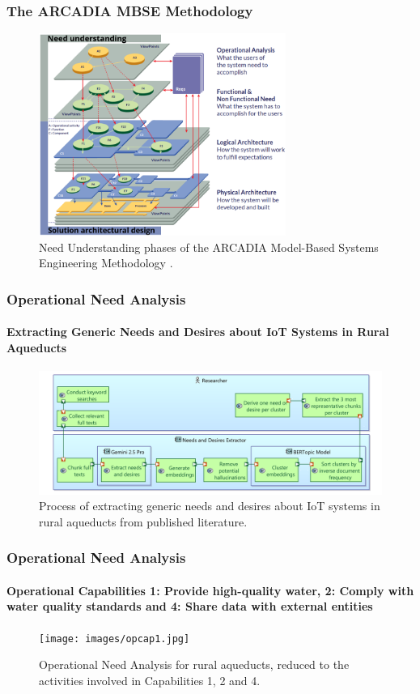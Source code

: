 \documentclass{beamer}
\begin{document}
\begin{frame}
    \frametitle{\small The ARCADIA MBSE Methodology}

    \begin{figure}
        \centering
        \includegraphics[width=0.72\textwidth]{images/phases_arcadia.png}
        \caption{Need Understanding phases of the ARCADIA Model-Based Systems Engineering Methodology \cite{Arcadia_phases}.}
    \end{figure}
\end{frame}


\begin{frame}
    \frametitle{\small Operational Need Analysis}
    \framesubtitle{Extracting Generic Needs and Desires about IoT Systems in Rural Aqueducts}

    \begin{figure}
        \centering
        \includegraphics[width=\textwidth]{images/bertopic.png}
        \caption{Process of extracting generic needs and desires about IoT systems in rural aqueducts from published literature.}
    \end{figure}
\end{frame}

\begin{frame}
    \frametitle{\small Operational Need Analysis}
    \framesubtitle{Operational Capabilities 1: Provide high-quality water, 2: Comply with water quality standards and 4: Share data with external entities}

    \begin{figure}
        \centering
        \texttt{[image: images/opcap1.jpg]}
        \caption{Operational Need Analysis for rural aqueducts, reduced to the activities involved in Capabilities 1, 2 and 4.}
    \end{figure}
\end{frame}
\end{document}
